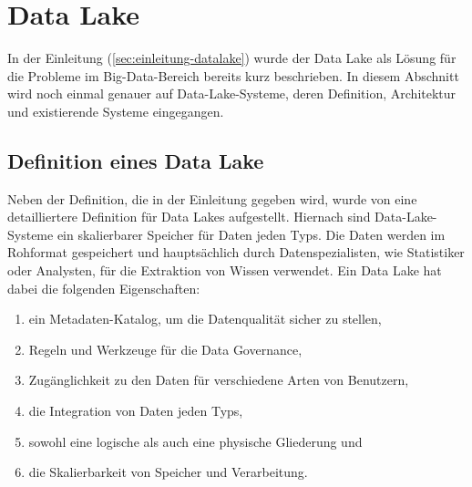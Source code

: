 \section{Data Lake}
In der Einleitung (\cref{sec:einleitung-datalake}) wurde der Data Lake als Lösung für die Probleme im Big-Data-Bereich bereits kurz beschrieben.
In diesem Abschnitt wird noch einmal genauer auf Data-Lake-Systeme, deren Definition, Architektur und existierende Systeme eingegangen.

\subsection{Definition eines Data Lake}
Neben der Definition, die in der Einleitung gegeben wird, wurde von \textcite{sawadogo2021data} eine detailliertere Definition für Data Lakes aufgestellt.
Hiernach sind Data-Lake-Systeme ein skalierbarer Speicher für Daten jeden Typs.
Die Daten werden im Rohformat gespeichert und hauptsächlich durch Datenspezialisten, wie Statistiker oder Analysten, für die Extraktion von Wissen verwendet.
Ein Data Lake hat dabei die folgenden Eigenschaften: \begin{enumerate}
    \item ein Metadaten-Katalog, um die Datenqualität sicher zu stellen,
    \item Regeln und Werkzeuge für die Data Governance,
    \item Zugänglichkeit zu den Daten für verschiedene Arten von Benutzern,
    \item die Integration von Daten jeden Typs,
    \item sowohl eine logische als auch eine physische Gliederung und
    \item die Skalierbarkeit von Speicher und Verarbeitung.
\end{enumerate}

